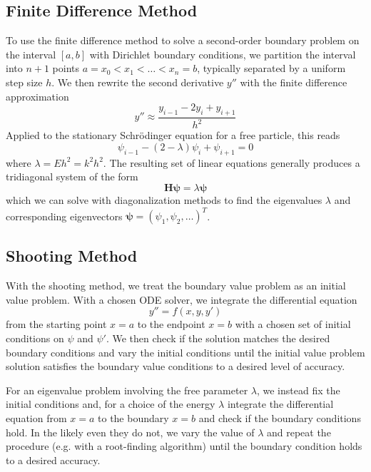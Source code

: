 \documentclass[11pt, a4paper]{article}
\newcommand{\schro}{Schr\"{o}dinger\xspace}
\newcommand{\mat}[1]{\mathbf{#1}}
\begin{document}
\subsection{Finite Difference Method}
To use the finite difference method to solve a second-order boundary problem on the interval $ [a, b] $ with Dirichlet boundary conditions, we partition the interval into $ n+1 $ points $ a = x_{0} < x_{1} < \ldots < x_{n} = b $, typically separated by a uniform step size $ h $. We then rewrite the second derivative $ y'' $ with the finite difference approximation
\begin{equation*}
	y'' \approx \frac{y_{i-1}-2y_{i}+y_{i+1}}{h^{2}}
\end{equation*}
Applied to the stationary \schro equation for a free particle, this reads
\begin{equation*}
	\psi_{i-1} - (2-\lambda)\psi_{i} + \psi_{i+1} = 0
\end{equation*}
where $ \lambda = Eh^{2} = k^{2}h^{2} $. The resulting set of linear equations generally produces a tridiagonal system of the form
\begin{equation*}
	\mat{H} \bm{\psi} = \lambda \bm{\psi}
\end{equation*}
which we can solve with diagonalization methods to find the eigenvalues $ \lambda $ and corresponding eigenvectors $ \bm{\psi} = (\psi_{1}, \psi_{2}, \ldots )^{T} $.

\subsection{Shooting Method}
With the shooting method, we treat the boundary value problem as an initial value problem. With a chosen ODE solver, we integrate the differential equation 
\begin{equation*}
	y'' = f(x, y, y') 
\end{equation*}
from the starting point $ x = a $ to the endpoint $ x = b $ with a chosen set of initial conditions on $ \psi $ and $ \psi' $. We then check if the solution matches the desired boundary conditions and vary the initial conditions until the initial value problem solution satisfies the boundary value conditions to a desired level of accuracy.

\vspace{2mm}

For an eigenvalue problem involving the free parameter $ \lambda $, we instead fix the initial conditions and, for a choice of the energy $ \lambda $ integrate the differential equation from $ x = a $ to the boundary $ x = b $ and check if the boundary conditions hold. In the likely even they do not, we vary the value of $ \lambda $ and repeat the procedure (e.g. with a root-finding algorithm) until the boundary condition holds to a desired accuracy.
\end{document}
